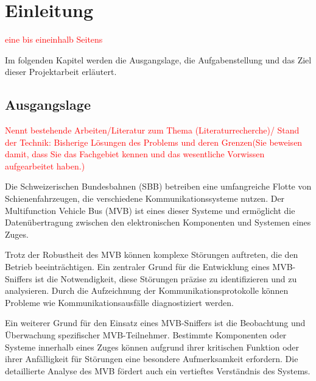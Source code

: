



\chapter{Einleitung} %
\label{chap1} %
\textcolor{red}{eine bis eineinhalb Seitens
}

Im folgenden Kapitel werden die Ausgangslage, die Aufgabenstellung und das Ziel dieser Projektarbeit erläutert. 


\section{Ausgangslage} %
\label{sec11} %

\textcolor{red}{Nennt bestehende Arbeiten/Literatur zum Thema (Literaturrecherche)/ Stand der Technik: Bisherige Lösungen des Problems und deren Grenzen(Sie beweisen damit, dass Sie das Fachgebiet kennen und das wesentliche Vorwissen aufgearbeitet haben.)}

Die Schweizerischen Bundesbahnen (SBB) betreiben eine umfangreiche Flotte von Schienenfahrzeugen, die verschiedene Kommunikationssysteme nutzen. Der Multifunction Vehicle Bus (MVB) ist eines dieser Systeme und ermöglicht die Datenübertragung zwischen den elektronischen Komponenten und Systemen eines Zuges.

Trotz der Robustheit des MVB können komplexe Störungen auftreten, die den Betrieb beeinträchtigen. Ein zentraler Grund für die Entwicklung eines MVB-Sniffers ist die Notwendigkeit, diese Störungen präzise zu identifizieren und zu analysieren. Durch die Aufzeichnung der Kommunikationsprotokolle können Probleme wie Kommunikationsausfälle diagnostiziert werden.

Ein weiterer Grund für den Einsatz eines MVB-Sniffers ist die Beobachtung und Überwachung spezifischer MVB-Teilnehmer. Bestimmte Komponenten oder Systeme innerhalb eines Zuges können aufgrund ihrer kritischen Funktion oder ihrer Anfälligkeit für Störungen eine besondere Aufmerksamkeit erfordern. Die detaillierte Analyse des MVB fördert auch ein vertieftes Verständnis des Systems.

